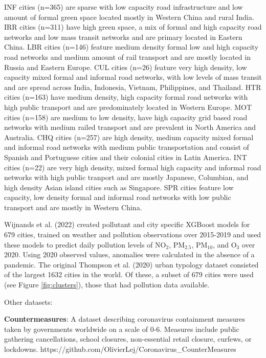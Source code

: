 \documentclass[preprint,12pt]{elsarticle}
\begin{document}
INF cities (n=365) are sparse with low capacity road infrastructure and low amount of formal green space located mostly in Western China and rural India. IRR cities (n=311) have high green space, a mix of formal and high capacity road networks and low mass transit networks and are primary located in Eastern China. LBR cities (n=146) feature medium density formal low and high capacity road networks and medium amount of rail transport and are mostly located in Russia and Eastern Europe. CUL cities (n=26) feature very high density, low capacity mixed formal and informal road networks, with low levels of mass transit and are spread across India, Indonesia, Vietnam, Philippines, and Thailand. HTR cities (n=163) have medium density, high capacity formal road networks with high public transport and are predominately located in Western Europe. MOT cities (n=158) are medium to low density, have high capacity grid based road networks with medium railed transport and are prevalent in North America and Australia. CHQ cities (n=257) are high density, medium capacity mixed formal and informal road networks with medium public transportation and consist of Spanish and Portuguese cities and their colonial cities in Latin America. INT cities (n=22) are very high density, mixed formal high capacity and informal road networks with high public tranport and are mostly Japanese, Columbian, and high density Asian island cities such as Singapore. SPR cities feature low capacity, low density formal and informal road networks with low public transport and are mostly in Western China.



Wijnands et al. (2022) \cite{Wijnands2022} created pollutant and city specific XGBoost models for 679 cities, trained on weather and pollution observations over 2015-2019 and used these models to predict daily pollution levels of NO$_{2}$, PM$_{2.5}$, PM$_{10}$, and O$_{3}$ over 2020. Using 2020 observed values, anomalies were calculated in the absence of a pandemic. The original Thompson et al. (2020) urban typology dataset consisted of the largest 1632 cities in the world. Of these, a subset of 679 cities were used (see Figure \ref{fig:clusters}), those that had pollution data available.

Other datasets:

\textbf{Countermeasures}: A dataset describing coronavirus containment measures taken by governments worldwide on a scale of 0-6. Measures include public gathering cancellations, school closures, non-essential retail closure, curfews, or lockdowns.
https://github.com/OlivierLej/Coronavirus\_CounterMeasures
\end{document}
